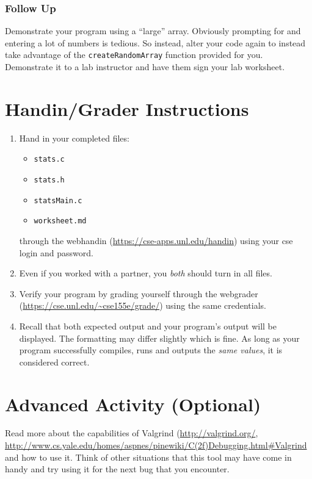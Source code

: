 \documentclass[12pt]{scrartcl}
\begin{document}
\subsubsection*{Follow Up}

Demonstrate your program using a ``large'' array.  Obviously prompting
for and entering a lot of numbers is tedious.  So instead, alter your code
again to instead take advantage of the \texttt{createRandomArray}
function provided for you.  Demonstrate it to a lab instructor and have
them sign your lab worksheet.

\section{Handin/Grader Instructions}

\begin{enumerate}
  \item Hand in your completed files:
  \begin{itemize}
    \item \texttt{stats.c}
    \item \texttt{stats.h}
    \item \texttt{statsMain.c}
    \item \texttt{worksheet.md}
  \end{itemize}
  through the webhandin (\url{https://cse-apps.unl.edu/handin})
  using your cse login and password.
  \item Even if you worked with a partner, you \emph{both} should
  turn in all files.
  \item Verify your program by grading yourself through the
  webgrader (\url{https://cse.unl.edu/~cse155e/grade/}) using the
  same credentials.
  \item Recall that both expected output and your program's output
  will be displayed.  The formatting may differ slightly which is fine.
  As long as your program successfully compiles, runs and outputs
  the \emph{same values}, it is considered correct.
\end{enumerate}


\section{Advanced Activity (Optional)}

Read more about the capabilities of Valgrind (\url{http://valgrind.org/},
\url{http://www.cs.yale.edu/homes/aspnes/pinewiki/C(2f)Debugging.html#Valgrind}
and how to use it.  Think of other situations that this tool may have come in
handy and try using it for the next bug that you encounter.
\end{document}
